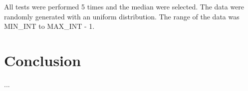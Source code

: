 \documentclass[a4paper]{article}
\begin{document}

All tests were performed 5 times and the median were selected. The data were randomly generated with an uniform distribution. The range of the data was MIN\_INT to MAX\_INT - 1.



\section{Conclusion}

...
\end{document}
